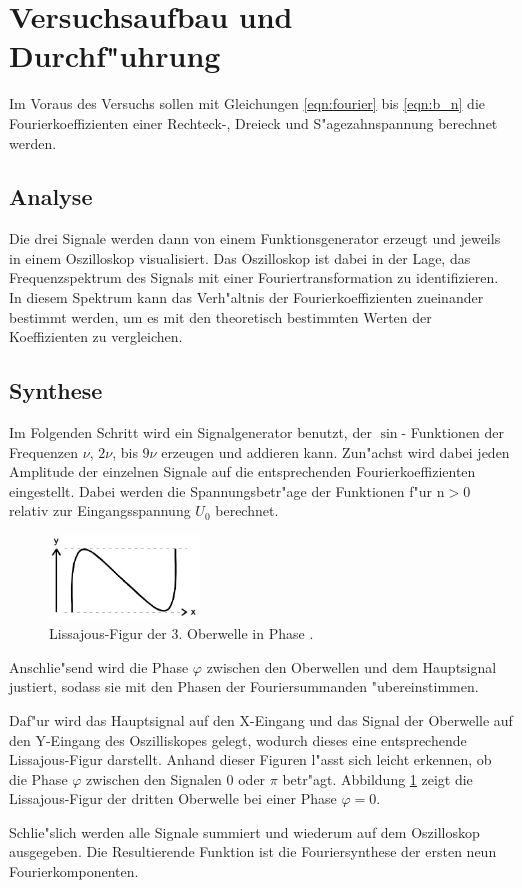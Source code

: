 \section{Versuchsaufbau und Durchf"uhrung} %
\label{sec:durchf_uhrung}
	Im Voraus des Versuchs sollen mit Gleichungen \eqref{eqn:fourier} bis \eqref{eqn:b_n} die Fourierkoeffizienten einer Rechteck-, Dreieck und S"agezahnspannung berechnet werden.

	\subsection{Analyse}
	\label{subsec:analyse}
		Die drei Signale werden dann von einem Funktionsgenerator erzeugt und jeweils in einem Oszilloskop visualisiert.
		Das Oszilloskop ist dabei in der Lage, das Frequenzspektrum des Signals mit einer Fouriertransformation zu identifizieren.
		In diesem Spektrum kann das Verh"altnis der Fourierkoeffizienten zueinander bestimmt werden, um es mit den theoretisch bestimmten Werten der Koeffizienten zu vergleichen.

	\subsection{Synthese}
	\label{subsec:synthese}
		Im Folgenden Schritt wird ein Signalgenerator benutzt, der $\sin$- Funktionen der Frequenzen $\nu$, $2\nu$, bis $9\nu$ erzeugen und addieren kann.
		Zun"achst wird dabei jeden Amplitude der einzelnen Signale auf die entsprechenden Fourierkoeffizienten eingestellt.
		Dabei werden die Spannungsbetr"age der Funktionen f"ur $\mathrm{n} > 0$ relativ zur Eingangsspannung $U_0$ berechnet.

		\clearpage

		\begin{figure}
			\centering
			\includegraphics[width = 4cm]{img/lissajous.jpeg}
			\captionsetup{format=plain}
			\caption{Lissajous-Figur der 3. Oberwelle in Phase \cite{anleitung}.}
			\label{fig:lissajous}
		\end{figure}

		Anschlie"send wird die Phase $\varphi$ zwischen den Oberwellen und dem Hauptsignal justiert, sodass sie mit den Phasen der Fouriersummanden "ubereinstimmen.

		Daf"ur wird das Hauptsignal auf den X-Eingang und das Signal der Oberwelle auf den Y-Eingang des Oszilliskopes gelegt, wodurch dieses eine entsprechende Lissajous-Figur darstellt.
		Anhand dieser Figuren l"asst sich leicht erkennen, ob die Phase $\varphi$ zwischen den Signalen 0 oder $\pi$ betr"agt.
		Abbildung \ref{fig:lissajous} zeigt die Lissajous-Figur der dritten Oberwelle bei einer Phase $\varphi = 0$.

		Schlie"slich werden alle Signale summiert und wiederum auf dem Oszilloskop ausgegeben.
		Die Resultierende Funktion ist die Fouriersynthese der ersten neun Fourierkomponenten.

		\clearpage